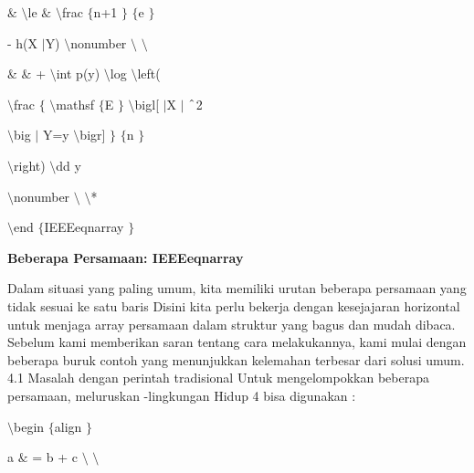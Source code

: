 \begin{itemize}
\noindent 
 $  \&  $  $  \setminus  $le  $  \&  $  $  \setminus  $frac $  \{  $n+1 $  \}  $ $  \{  $e $  \}  $ \par
\vspace{12pt}
\noindent 
- h(X $  \vert  $Y)  $  \setminus  $nonumber $  \setminus  $ $  \setminus  $ \par
\vspace{12pt}
\noindent 
 $  \&  $ $  \&  $ +  $  \setminus  $int p(y)  $  \setminus  $log  $  \setminus  $left( \par
\vspace{12pt}
\noindent 
 $  \setminus  $frac $  \{  $ $  \setminus  $mathsf $  \{  $E $  \}  $ $  \setminus  $bigl[ $  \vert  $X $  \vert  $ $  \string^  $2 \par
\vspace{12pt}
\noindent 
 $  \setminus  $big $  \vert  $ Y=y $  \setminus  $bigr] $  \}  $ $  \{  $n $  \}  $ \par
\vspace{12pt}
\noindent 
 $  \setminus  $right)  $  \setminus  $dd y \par
\vspace{12pt}
\noindent 
 $  \setminus  $nonumber $  \setminus  $ $  \setminus  $* \par
\vspace{12pt}
\noindent 
 $  \setminus  $end $  \{  $IEEEeqnarray $  \}  $ \par
\vspace{12pt}
\vspace{12pt}
\noindent 
\textbf{Beberapa Persamaan: IEEEeqnarray} \par
\noindent 
 \hspace*{0.5in} Dalam situasi yang paling umum, kita memiliki urutan beberapa persamaan yang tidak sesuai ke satu baris Disini kita perlu bekerja dengan kesejajaran horizontal untuk menjaga array persamaan dalam struktur yang bagus dan mudah dibaca. Sebelum kami memberikan saran tentang cara melakukannya, kami mulai dengan beberapa buruk contoh yang menunjukkan kelemahan terbesar dari solusi umum. 4.1 Masalah dengan perintah tradisional Untuk mengelompokkan beberapa persamaan, meluruskan -lingkungan Hidup 4 bisa digunakan : \par
\vspace{12pt}
\noindent 
 $  \setminus  $begin $  \{  $align $  \}  $ \par
\vspace{12pt}
\noindent 
a  $  \&  $ = b + c  $  \setminus  $ $  \setminus  $ \par

\end{itemize}
